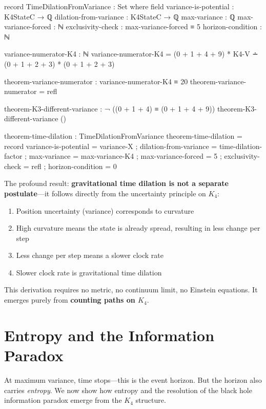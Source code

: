 \documentclass[11pt,a4paper]{book}
\begin{document}
\begin{code}
record TimeDilationFromVariance : Set where
  field
    variance-is-potential : K4StateC → ℚ
    dilation-from-variance : K4StateC → ℚ
    max-variance : ℚ
    max-variance-forced : ℕ
    exclusivity-check : max-variance-forced ≡ 5
    horizon-condition : ℕ

variance-numerator-K4 : ℕ
variance-numerator-K4 = (0 + 1 + 4 + 9) * K4-V ∸ (0 + 1 + 2 + 3) * (0 + 1 + 2 + 3)

theorem-variance-numerator : variance-numerator-K4 ≡ 20
theorem-variance-numerator = refl

theorem-K3-different-variance : ¬ ((0 + 1 + 4) ≡ (0 + 1 + 4 + 9))
theorem-K3-different-variance ()

theorem-time-dilation : TimeDilationFromVariance
theorem-time-dilation = record
  { variance-is-potential = variance-X
  ; dilation-from-variance = time-dilation-factor
  ; max-variance = max-variance-K4
  ; max-variance-forced = 5
  ; exclusivity-check = refl
  ; horizon-condition = 0
  }
\end{code}

The profound result: \textbf{gravitational time dilation is not a separate 
postulate}---it follows directly from the uncertainty principle on $K_4$:

\begin{enumerate}
\item Position uncertainty (variance) corresponds to curvature
\item High curvature means the state is already spread, resulting in less change per step
\item Less change per step means a slower clock rate
\item Slower clock rate is gravitational time dilation
\end{enumerate}

This derivation requires no metric, no continuum limit, no Einstein equations.
It emerges purely from \textbf{counting paths on $K_4$}.

\chapter{Entropy and the Information Paradox}
\label{chap:entropy-information}

At maximum variance, time stops---this is the event horizon. But the horizon also carries \emph{entropy}. We now show how entropy and the resolution of the black hole information paradox emerge from the $K_4$ structure.
\end{document}
